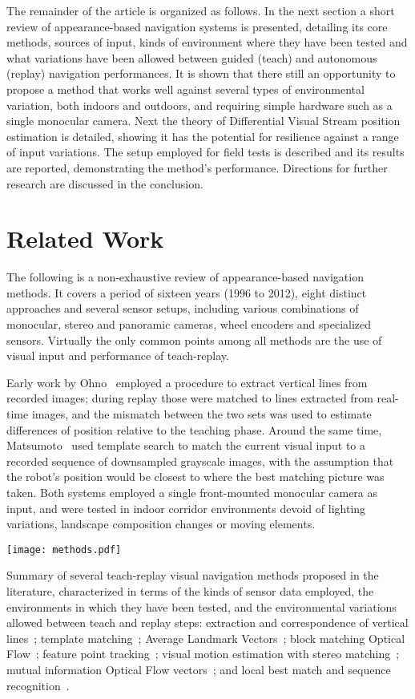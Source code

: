 \documentclass[twocolumn, 9pt,fleqn]{jsproceedings}
\begin{document}
The remainder of the article is organized as follows. In the next section a short review of appearance-based navigation systems is presented, detailing its core methods, sources of input, kinds of environment where they have been tested and what variations have been allowed between guided (teach) and autonomous (replay) navigation performances. It is shown that there still an opportunity to propose a method that works well against several types of environmental variation, both indoors and outdoors, and requiring simple hardware such as a single monocular camera. Next the theory of Differential Visual Stream position estimation is detailed, showing it has the potential for resilience against a range of input variations. The setup employed for field tests is described and its results are reported, demonstrating the method's performance. Directions for further research are discussed in the conclusion.

\section{Related Work}

The following is a non-exhaustive review of appearance-based navigation methods. It covers a period of sixteen years (1996 to 2012), eight distinct approaches and several sensor setups, including various combinations of monocular, stereo and panoramic cameras, wheel encoders and specialized sensors. Virtually the only common points among all methods are the use of visual input and performance of teach-replay.

Early work by Ohno~\cite{OYA96} employed a procedure to extract vertical lines from recorded images; during replay those were matched to lines extracted from real-time images, and the mismatch between the two sets was used to estimate differences of position relative to the teaching phase. Around the same time, Matsumoto~\cite{MAT96} used template search to match the current visual input to a recorded sequence of downsampled grayscale images, with the assumption that the robot's position would be closest to where the best matching picture was taken. Both systems employed a single front-mounted monocular camera as input, and were tested in indoor corridor environments devoid of lighting variations, landscape composition changes or moving elements.

\begin{table}[h!]
\centering
\texttt{[image: methods.pdf]}
\caption{Summary of several teach-replay visual navigation methods proposed in the literature, characterized in terms of the kinds of sensor data employed, the environments in which they have been tested, and the environmental variations allowed between teach and replay steps: extraction and correspondence of vertical lines~\cite{OYA96}; template matching~\cite{MAT96}; Average Landmark Vectors~\cite{LAM00}; block matching Optical Flow~\cite{VAR05}; feature point tracking~\cite{CHE06}; visual motion estimation with stereo matching~\cite{KIM08}; mutual information Optical Flow vectors~\cite{STE12}; and local best match and sequence recognition~\cite{MIL12}.}
\label{tab:methods}
\end{table}
\end{document}
